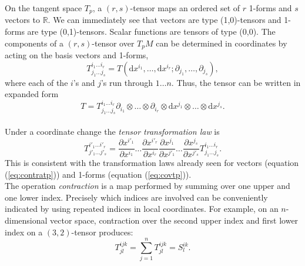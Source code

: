 On the tangent space $T_p$, a $(r,s)$-tensor maps an ordered set of $r$ 1-forms
and $s$ vectors to $\mathbb{R}$. We can immediately see that vectors are type
(1,0)-tensors and 1-forms are type (0,1)-tensors. Scalar functions are tensors
of type (0,0). The components of a $(r,s)$-tensor over $T_p M$ can be determined
in coordinates by acting on the basis vectors and 1-forms,
\[ T^{i_1\dots i_r}_{j_1\dots
j_s}=T(\mbox{d}x^{i_1},\dots,\mbox{d}x^{i_r};\partial_{j_1},\dots,\partial_{j_s}
), \]
where each of the $i$'s and $j$'s run through $1\dots n$. Thus, the tensor can
be written in expanded form
\[ T=T^{i_1\dots i_r}_{j_1\dots j_s}\partial_{i_1}\otimes \dots \otimes
\partial_{i_r}\otimes \mbox{d}x^{j_1}\otimes \dots \otimes \mbox{d}x^{j_s}. \]\\

Under a coordinate change the \textit{tensor transformation law} is
\begin{equation} T^{i'_1\dots i'_r}_{j'_1 \dots j'_s}=\frac{\partial
x^{i'_1}}{\partial x^{i_1}}\dots \frac{\partial x^{i'_r}}{\partial
x^{i_r}}\frac{\partial x^{j_1}}{\partial x^{j'_1}}\dots \frac{\partial
x^{j_s}}{\partial x^{j'_s}} T^{i_1\dots i_r}_{j_1 \dots j_s}.
\label{eq:ttl}\end{equation}
This is consistent with the transformation laws already seen for vectors
(equation (\ref{eq:contratp})) and 1-forms (equation (\ref{eq:covtp})).\\

The operation \textit{contraction} is a map performed by summing over one upper
and one lower index. Precisely which indices are involved can be conveniently
indicated by using repeated indices in local coordinates. For example, on an
$n$-dimensional vector space, contraction over the second upper index and first
lower index on a $(3,2)$-tensor produces:
\[ T^{ijk}_{jl}=\sum^n_{j=1}T^{ijk}_{jl} = S^{ik}_{l}.\]\\

